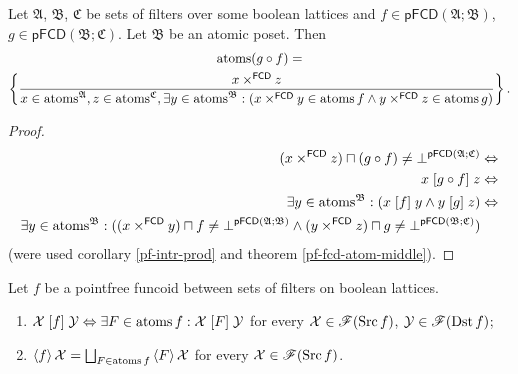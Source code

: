\begin{prop}
Let $\mathfrak{A}$, $\mathfrak{B}$, $\mathfrak{C}$ be sets of filters
over some boolean lattices and $f\in\mathsf{pFCD}(\mathfrak{A};\mathfrak{B})$,
$g\in\mathsf{pFCD}(\mathfrak{B};\mathfrak{C})$. Let $\mathfrak{B}$
be an atomic poset. Then
\begin{multline*}
\operatorname{atoms}(g\circ f)=\\
\left\{ \frac{x\times^{\mathsf{FCD}}z}{x\in\operatorname{atoms}^{\mathfrak{A}},z\in\operatorname{atoms}^{\mathfrak{C}},\exists y\in\operatorname{atoms}^{\mathfrak{B}}:(x\times^{\mathsf{FCD}}y\in\operatorname{atoms} f\land y\times^{\mathsf{FCD}}z\in\operatorname{atoms} g)}\right\}.
\end{multline*}
\end{prop}
\begin{proof}
~
\begin{align*}
(x\times^{\mathsf{FCD}}z)\sqcap(g\circ f)\ne\bot^{\mathsf{pFCD}(\mathfrak{A};\mathfrak{C})} & \Leftrightarrow\\
x\mathrel{\left[g\circ f\right]}z & \Leftrightarrow\\
\exists y\in\operatorname{atoms}^{\mathfrak{B}}:(x\mathrel{\left[f\right]}y\land y\mathrel{\left[g\right]}z) & \Leftrightarrow\\
\exists y\in\operatorname{atoms}^{\mathfrak{B}}:((x\times^{\mathsf{FCD}}y)\sqcap f\ne\bot^{\mathsf{pFCD}(\mathfrak{A};\mathfrak{B})}\land(y\times^{\mathsf{FCD}}z)\sqcap g\ne\bot^{\mathsf{pFCD}(\mathfrak{B};\mathfrak{C})})
\end{align*}
(were used corollary \ref{pf-intr-prod} and theorem \ref{pf-fcd-atom-middle}).\end{proof}
\begin{thm}
Let $f$ be a pointfree funcoid between sets of filters on boolean
lattices.
\begin{enumerate}
\item \label{pf-r-at}$\mathcal{X}\mathrel{\left[f\right]}\mathcal{Y}\Leftrightarrow\exists F\in\operatorname{atoms} f:\mathcal{X}\mathrel{\left[F\right]}\mathcal{Y}$
for every $\mathcal{X}\in\mathscr{F}(\operatorname{Src} f)$, $\mathcal{Y}\in\mathscr{F}(\operatorname{Dst} f)$;
\item \label{pf-f-at}$\left\langle f\right\rangle\mathcal{X}=\bigsqcup_{F\in\operatorname{atoms} f}\left\langle F\right\rangle\mathcal{X}$
for every $\mathcal{X}\in\mathscr{F}(\operatorname{Src} f)$.
\end{enumerate}
\end{thm}
